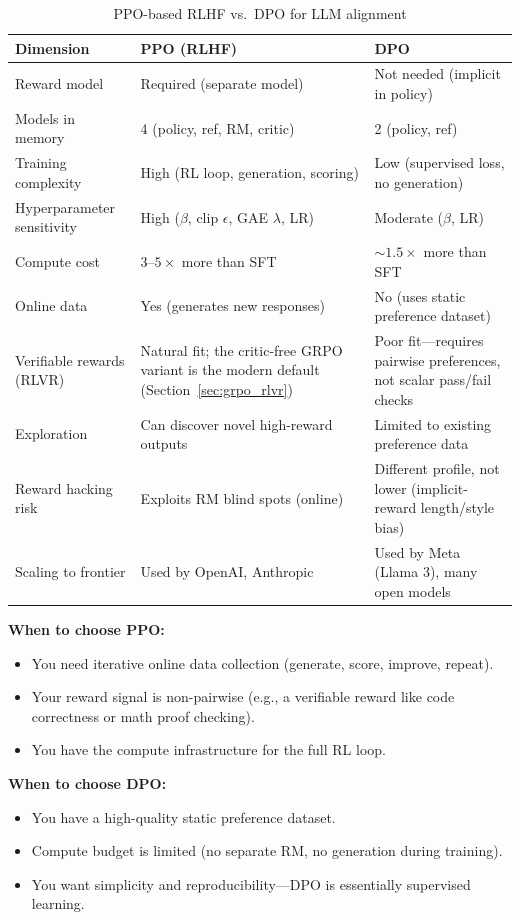 \begin{table}[H]
\centering
\caption{PPO-based RLHF vs.\ DPO for LLM alignment}
\begin{tabularx}{\textwidth}{lXX}
\toprule
\textbf{Dimension} & \textbf{PPO (RLHF)} & \textbf{DPO} \\
\midrule
Reward model & Required (separate model) & Not needed (implicit in policy) \\
Models in memory & 4 (policy, ref, RM, critic) & 2 (policy, ref) \\
Training complexity & High (RL loop, generation, scoring) & Low (supervised loss, no generation) \\
Hyperparameter sensitivity & High ($\beta$, clip $\epsilon$, GAE $\lambda$, LR) & Moderate ($\beta$, LR) \\
Compute cost & $3$--$5\times$ more than SFT & $\sim 1.5\times$ more than SFT \\
Online data & Yes (generates new responses) & No (uses static preference dataset) \\
Verifiable rewards (RLVR) & Natural fit; the critic-free GRPO variant is the modern default (Section~\ref{sec:grpo_rlvr}) & Poor fit---requires pairwise preferences, not scalar pass/fail checks \\
Exploration & Can discover novel high-reward outputs & Limited to existing preference data \\
Reward hacking risk & Exploits RM blind spots (online) & Different profile, not lower (implicit-reward length/style bias) \\
Scaling to frontier & Used by OpenAI, Anthropic & Used by Meta (Llama 3), many open models \\
\bottomrule
\end{tabularx}
\end{table}

\textbf{When to choose PPO:}
\begin{itemize}
    \item You need iterative online data collection (generate, score, improve, repeat).
    \item Your reward signal is non-pairwise (e.g., a verifiable reward like code correctness or math proof checking).
    \item You have the compute infrastructure for the full RL loop.
\end{itemize}

\textbf{When to choose DPO:}
\begin{itemize}
    \item You have a high-quality static preference dataset.
    \item Compute budget is limited (no separate RM, no generation during training).
    \item You want simplicity and reproducibility---DPO is essentially supervised learning.
\end{itemize}

